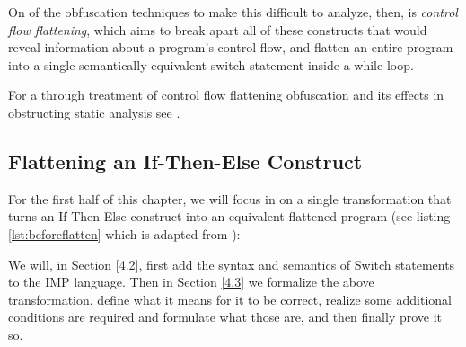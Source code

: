 \documentclass[compsoc,conference,a4paper,10pt,times]{IEEEtran}
\begin{document}
\par On of the obfuscation techniques to make this difficult to analyze, then, is \emph{control flow flattening}, which aims to break apart all of these constructs that would reveal information about a program's control flow, and flatten an entire program into a single semantically equivalent switch statement inside a while loop.

\par For a through treatment of control flow flattening obfuscation and its effects in obstructing static analysis see \cite{Wang}.  

\subsection{Flattening an If-Then-Else Construct}
For the first half of this chapter, we will focus in on a single transformation that turns an If-Then-Else construct into an equivalent flattened program (see listing \ref{lst:beforeflatten} which is adapted from \cite{Blazy2}):




We will, in Section \ref{4.2}, first add the syntax and semantics of Switch statements to the IMP language.  Then in Section \ref{4.3} we formalize the above transformation, define what it means for it to be correct, realize some additional conditions are required and formulate what those are, and then finally prove it so.
\end{document}
